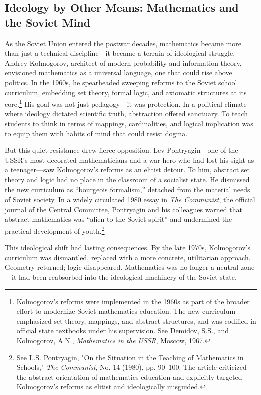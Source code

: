 \subsection{Ideology by Other Means: Mathematics and the Soviet Mind}

As the Soviet Union entered the postwar decades, mathematics became more than just a technical discipline—it became a terrain of ideological struggle. Andrey Kolmogorov, architect of modern probability and information theory, envisioned mathematics as a universal language, one that could rise above politics. In the 1960s, he spearheaded sweeping reforms to the Soviet school curriculum, embedding set theory, formal logic, and axiomatic structures at its core.\footnote{Kolmogorov’s reforms were implemented in the 1960s as part of the broader effort to modernize Soviet mathematics education. The new curriculum emphasized set theory, mappings, and abstract structures, and was codified in official state textbooks under his supervision. See Demidov, S.S., and Kolmogorov, A.N., \textit{Mathematics in the USSR}, Moscow, 1967.} His goal was not just pedagogy—it was protection. In a political climate where ideology dictated scientific truth, abstraction offered sanctuary. To teach students to think in terms of mappings, cardinalities, and logical implication was to equip them with habits of mind that could resist dogma.

But this quiet resistance drew fierce opposition. Lev Pontryagin—one of the USSR’s most decorated mathematicians and a war hero who had lost his sight as a teenager—saw Kolmogorov’s reforms as an elitist detour. To him, abstract set theory and logic had no place in the classroom of a socialist state. He dismissed the new curriculum as “bourgeois formalism,” detached from the material needs of Soviet society. In a widely circulated 1980 essay in \textit{The Communist}, the official journal of the Central Committee, Pontryagin and his colleagues warned that abstract mathematics was “alien to the Soviet spirit” and undermined the practical development of youth.\footnote{See L.S. Pontryagin, "On the Situation in the Teaching of Mathematics in Schools," \textit{The Communist}, No. 14 (1980), pp. 90–100. The article criticized the abstract orientation of mathematics education and explicitly targeted Kolmogorov’s reforms as elitist and ideologically misguided.}

This ideological shift had lasting consequences. By the late 1970s, Kolmogorov’s curriculum was dismantled, replaced with a more concrete, utilitarian approach. Geometry returned; logic disappeared. Mathematics was no longer a neutral zone—it had been reabsorbed into the ideological machinery of the Soviet state.

